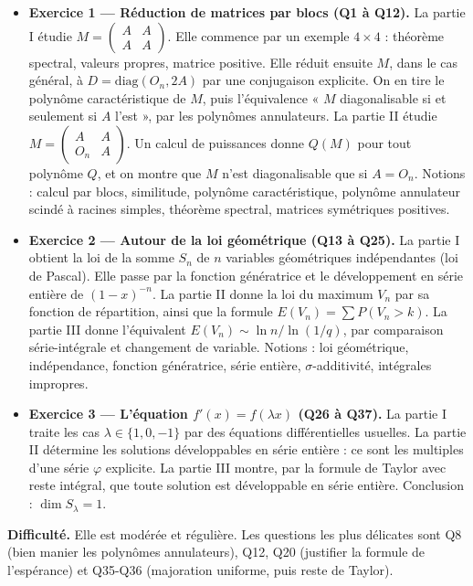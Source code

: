 \documentclass[11pt,a4paper]{article}
\providecommand{\tightlist}{\setlength{\itemsep}{0pt}\setlength{\parskip}{0pt}}
\begin{document}
\begin{itemize}
\tightlist
\item
  \textbf{Exercice 1 --- Réduction de matrices par blocs (Q1 à Q12).} La partie I étudie \(M=\begin{pmatrix}A&A\\A&A\end{pmatrix}\). Elle commence par un exemple \(4\times4\) : théorème spectral, valeurs propres, matrice positive.
  Elle réduit ensuite \(M\), dans le cas général, à \(D=\mathrm{diag}(O_n,2A)\) par une conjugaison explicite. On en tire le polynôme caractéristique de \(M\), puis l'équivalence « \(M\) diagonalisable si et seulement si \(A\) l'est », par les polynômes annulateurs.
  La partie II étudie \(M=\begin{pmatrix}A&A\\O_n&A\end{pmatrix}\). Un calcul de puissances donne \(Q(M)\) pour tout polynôme \(Q\), et on montre que \(M\) n'est diagonalisable que si \(A=O_n\).
  Notions : calcul par blocs, similitude, polynôme caractéristique, polynôme annulateur scindé à racines simples, théorème spectral, matrices symétriques positives.
\item
  \textbf{Exercice 2 --- Autour de la loi géométrique (Q13 à Q25).} La partie I obtient la loi de la somme \(S_n\) de \(n\) variables géométriques indépendantes (loi de Pascal). Elle passe par la fonction génératrice et le développement en série entière de \((1-x)^{-n}\).
  La partie II donne la loi du maximum \(V_n\) par sa fonction de répartition, ainsi que la formule \(E(V_n)=\sum P(V_n>k)\).
  La partie III donne l'équivalent \(E(V_n)\sim\ln n/\ln(1/q)\), par comparaison série-intégrale et changement de variable.
  Notions : loi géométrique, indépendance, fonction génératrice, série entière, \(\sigma\)-additivité, intégrales impropres.
\item
  \textbf{Exercice 3 --- L'équation \(f'(x)=f(\lambda x)\) (Q26 à Q37).} La partie I traite les cas \(\lambda\in\{1,0,-1\}\) par des équations différentielles usuelles. La partie II détermine les solutions développables en série entière : ce sont les multiples d'une série \(\varphi\) explicite.
  La partie III montre, par la formule de Taylor avec reste intégral, que toute solution est développable en série entière. Conclusion : \(\dim S_\lambda=1\).
\end{itemize}

\textbf{Difficulté.} Elle est modérée et régulière. Les questions les plus délicates sont Q8 (bien manier les polynômes annulateurs), Q12, Q20 (justifier la formule de l'espérance) et Q35-Q36 (majoration uniforme, puis reste de Taylor).
\end{document}
